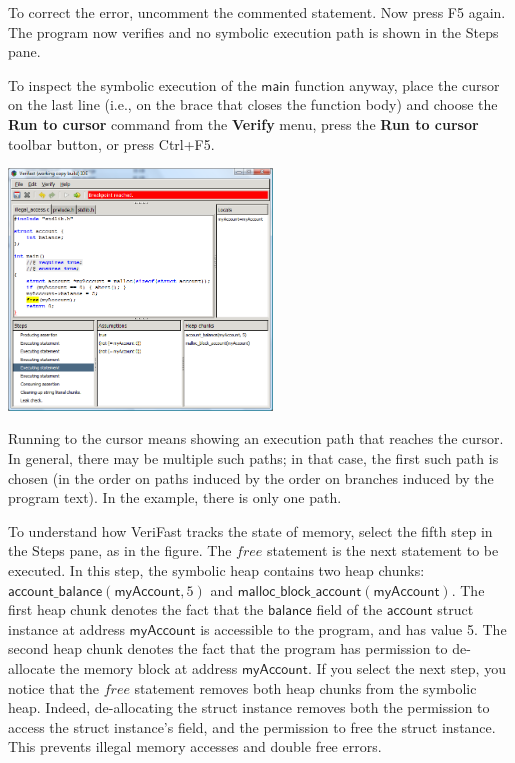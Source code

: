 \documentclass{article}
\begin{document}
To correct the error, uncomment the commented statement. Now
press F5 again. The program now verifies and no symbolic
execution path is shown in the Steps pane.

To inspect the symbolic execution of the $\mathsf{main}$
function anyway, place the cursor on the last line (i.e., on
the brace that closes the function body) and choose the
\textbf{Run to cursor} command from the \textbf{Verify} menu,
press the \textbf{Run to cursor} toolbar button, or press
Ctrl+F5.
\begin{center}
\includegraphics[width=7cm]{illegal_access2.png}
\end{center}
Running to the cursor means showing an execution path that
reaches the cursor. In general, there may be multiple such
paths; in that case, the first such path is chosen (in the
order on paths induced by the order on branches induced by the
program text). In the example, there is only one path.

To understand how VeriFast tracks the state of memory, select
the fifth step in the Steps pane, as in the figure. The
$\mathit{free}$ statement is the next statement to be executed.
In this step, the symbolic heap contains two heap chunks:
$\mathsf{account\_balance}(\mathsf{myAccount}, 5)$ and
$\mathsf{malloc\_block\_account}(\mathsf{myAccount})$. The
first heap chunk denotes the fact that the $\mathsf{balance}$
field of the $\mathsf{account}$ struct instance at address
$\mathsf{myAccount}$ is accessible to the program, and has
value 5. The second heap chunk denotes the fact that the
program has permission to de-allocate the memory block at
address $\mathsf{myAccount}$. If you select the next step, you
notice that the $\mathit{free}$ statement removes both heap
chunks from the symbolic heap. Indeed, de-allocating the struct
instance removes both the permission to access the struct
instance's field, and the permission to free the struct
instance. This prevents illegal memory accesses and double free
errors.
\end{document}
